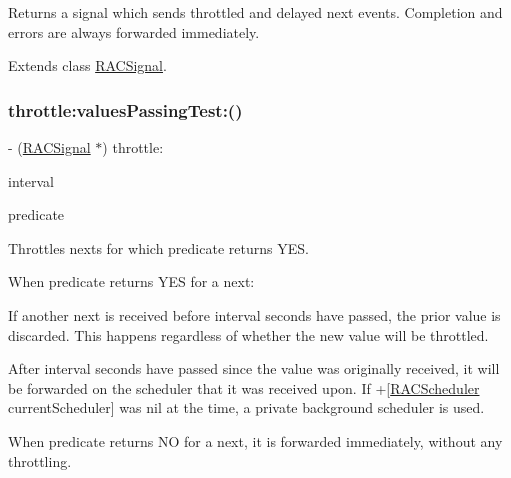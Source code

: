 Returns a signal which sends throttled and delayed {\ttfamily next} events. Completion and errors are always forwarded immediately. 

Extends class \mbox{\hyperlink{interface_r_a_c_signal_a2542ae804d05ec734d0f4d2fa8c3ac93}{R\+A\+C\+Signal}}.

\mbox{\label{category_r_a_c_signal_07_operations_08_a0310fbee83b4ca1b1daca25daf24f41b}} 
\subsubsection{\texorpdfstring{throttle\+:values\+Passing\+Test\+:()}{throttle:valuesPassingTest:()}\hspace{0.1cm}{\footnotesize\ttfamily [1/3]}}
{\footnotesize\ttfamily -\/ (\mbox{\hyperlink{interface_r_a_c_signal}{R\+A\+C\+Signal}} $\ast$) throttle\+: \begin{DoxyParamCaption}\item[{(N\+S\+Time\+Interval)}]{interval }\item[{valuesPassingTest:(B\+O\+OL($^\wedge$)(id next))}]{predicate }\end{DoxyParamCaption}}

Throttles {\ttfamily next}s for which {\ttfamily predicate} returns Y\+ES.

When {\ttfamily predicate} returns Y\+ES for a {\ttfamily next}\+:


\begin{DoxyEnumerate}
\item If another {\ttfamily next} is received before {\ttfamily interval} seconds have passed, the prior value is discarded. This happens regardless of whether the new value will be throttled.
\item After {\ttfamily interval} seconds have passed since the value was originally received, it will be forwarded on the scheduler that it was received upon. If +\mbox{[}\mbox{\hyperlink{interface_r_a_c_scheduler}{R\+A\+C\+Scheduler}} current\+Scheduler\mbox{]} was nil at the time, a private background scheduler is used.
\end{DoxyEnumerate}

When {\ttfamily predicate} returns NO for a {\ttfamily next}, it is forwarded immediately, without any throttling.

